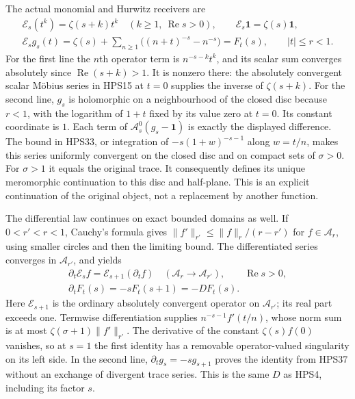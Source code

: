 The actual monomial and Hurwitz receivers are
\begin{equation}\tag{HPS37}
\begin{gathered}
 \mathscr E_s(t^k)=\zeta(s+k)t^k
       \quad(k\ge1,\ \operatorname{Re}s>0),\qquad
 \mathscr E_s\mathbf1=\zeta(s)\mathbf1,\\
 \mathscr E_sg_s(t)
     =\zeta(s)+\sum_{n\ge1}
                 \bigl((n+t)^{-s}-n^{-s}\bigr)
     =F_t(s),\qquad |t|\le r<1 .
\end{gathered}
\end{equation}
For the first line the $n$th operator
term is $n^{-s-k}t^k$, and its scalar
sum converges absolutely since
$\operatorname{Re}(s+k)>1$.
It is nonzero there: the absolutely
convergent scalar Möbius series in
HPS15 at $t=0$ supplies the inverse
of $\zeta(s+k)$.
For the second line, $g_s$ is
holomorphic on a neighbourhood of
the closed disc because $r<1$,
with the logarithm of $1+t$ fixed
by its value zero at $t=0$.
Its constant coordinate is $1$.
Each term of
$\mathcal A_s^0(g_s-\mathbf1)$
is exactly the displayed difference.
The bound in HPS33, or integration
of $-s(1+w)^{-s-1}$ along $w=t/n$,
makes this series uniformly
convergent on the closed disc and
on compact sets of $\sigma>0$.
For $\sigma>1$ it equals the original
trace. It consequently defines
its unique meromorphic continuation
to this disc and half-plane.
This is an explicit continuation
of the original object, not a
replacement by another function.

The differential law continues on exact
bounded domains as well. If $0<r'<r<1$,
Cauchy's formula gives
$\|f'\|_{r'}\le\|f\|_r/(r-r')$ for
$f\in\mathcal A_r$, using smaller
circles and then the limiting bound.
The differentiated series converges
in $\mathcal A_{r'}$, and yields
\begin{equation}\tag{HPS38}
\begin{gathered}
 \partial_t\mathscr E_sf
         =\mathcal E_{s+1}(\partial_tf)
                 \quad(\mathcal A_r\longrightarrow\mathcal A_{r'}),
       \qquad \operatorname{Re}s>0,\\
 \partial_tF_t(s)=-sF_t(s+1)=-DF_t(s).
\end{gathered}
\end{equation}
Here $\mathcal E_{s+1}$ is the ordinary
absolutely convergent operator on
$\mathcal A_{r'}$; its real part exceeds
one. Termwise differentiation supplies
$n^{-s-1}f'(t/n)$, whose norm sum is
at most $\zeta(\sigma+1)\|f'\|_{r'}$.
The derivative of the constant
$\zeta(s)f(0)$ vanishes, so at $s=1$
the first identity has a removable
operator-valued singularity on its
left side. In the second line,
$\partial_tg_s=-s g_{s+1}$ proves
the identity from HPS37 without
an exchange of divergent trace
series. This is the same $D$ as
HPS4, including its factor $s$.

